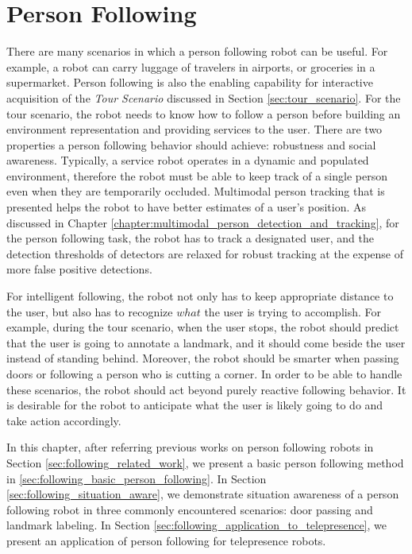 
\chapter{Person Following}
\label{chapter:person_following}

There are many scenarios in which a person following robot can be useful. For example, a robot can carry luggage of travelers in airports, or groceries in a supermarket. Person following is also the enabling capability for interactive acquisition of the \textit{Tour Scenario} discussed in Section \ref{sec:tour_scenario}. For the tour scenario, the robot needs to know how to follow a person before building an environment representation and providing services to the user.  There are two properties a person following behavior should achieve: robustness and social awareness. Typically, a service robot operates in a dynamic and populated environment, therefore the robot must be able to keep track of a single person even when they are temporarily occluded. Multimodal person tracking that is presented helps the robot to have better estimates of a user's position. As discussed in Chapter \ref{chapter:multimodal_person_detection_and_tracking}, for the person following task, the robot has to track a designated user, and the detection thresholds of detectors are relaxed for robust tracking at the expense of more false positive detections. 

For intelligent following, the robot not only has to keep appropriate distance to the user, but also has to recognize $what$ the user is trying to accomplish. For example, during the tour scenario, when the user stops, the robot should predict that the user is going to annotate a landmark, and it should come beside the user instead of standing behind. Moreover, the robot should be smarter when passing doors or following a person who is cutting a corner. In order to be able to handle these scenarios, the robot should act beyond purely reactive following behavior. It is desirable for the robot to anticipate what the user is likely going to do and take action accordingly.

In this chapter, after referring previous works on person following robots in Section \ref{sec:following_related_work}, we present a basic person following method in \ref{sec:following_basic_person_following}. In Section \ref{sec:following_situation_aware}, we demonstrate situation awareness of a person following robot in three commonly encountered scenarios: door passing and landmark labeling. In Section \ref{sec:following_application_to_telepresence}, we present an application of person following for telepresence robots.

